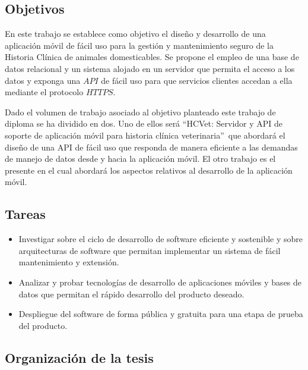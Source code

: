 \subsection*{Objetivos}

En este trabajo se establece como objetivo el diseño y desarrollo de una aplicación móvil de fácil uso para la gestión y mantenimiento seguro de la Historia Clínica de animales domesticables. Se propone el empleo de una base de datos relacional y un sistema alojado en un servidor que permita el acceso a los datos y exponga una $API$ de fácil uso para que servicios clientes accedan a ella mediante el protocolo $HTTPS$.

Dado el volumen de trabajo asociado al objetivo planteado este trabajo de diploma se ha dividido en dos. Uno de ellos será \textquotedblleft HCVet: Servidor y API de soporte de aplicación móvil para historia clínica veterinaria\textquotedblright\ que abordará el diseño de una API de fácil uso que responda de manera eficiente a las demandas de manejo de datos desde y hacia la aplicación móvil. El otro trabajo es el presente en el cual abordará los aspectos relativos al desarrollo de la aplicación móvil.

\subsection*{Tareas}

\begin{itemize}
\item Investigar sobre el ciclo de desarrollo de software eficiente y sostenible y sobre arquitecturas de software que permitan implementar un sistema de fácil mantenimiento y extensión.
\item Analizar y probar tecnologías de desarrollo de aplicaciones móviles y bases de datos que permitan el rápido desarrollo del producto deseado.
\item Despliegue del software de forma pública y gratuita para una etapa de prueba del producto.
\end{itemize}

\subsection*{Organizaci\'on de la tesis}

